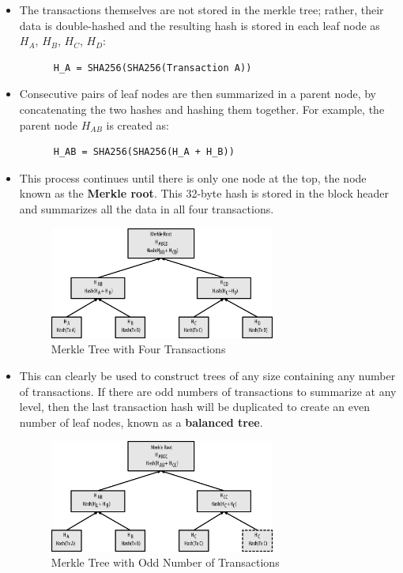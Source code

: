 \documentclass{article}
\begin{document}
    \begin{itemize}
      \item The transactions themselves are not stored in the merkle tree; rather, their data is double-hashed and the resulting hash is stored in each leaf node as $H_A$, $H_B$, $H_C$, $H_D$:
      \begin{lstlisting}
      H_A = SHA256(SHA256(Transaction A))
      \end{lstlisting}
      \item Consecutive pairs of leaf nodes are then summarized in a parent node, by concatenating the two hashes and hashing them together. For example, the parent node $H_{AB}$ is created as:
      \begin{lstlisting}
      H_AB = SHA256(SHA256(H_A + H_B))
      \end{lstlisting}
      \item This process continues until there is only one node at the top, the node known as the \textbf{Merkle root}. This 32-byte hash is stored in the block header and summarizes all the data in all four transactions.
      
      \begin{figure}[H]
      \centering
      \includegraphics[width=0.7\textwidth]{img/msbt_0702.png}
      \caption{Merkle Tree with Four Transactions}
      \end{figure}

      \item This can clearly be used to construct trees of any size containing any number of transactions. If there are odd numbers of transactions to summarize at any level, then the last transaction hash will be duplicated to create an even number of leaf nodes, known as a \textbf{balanced tree}.
      
      \begin{figure}[H]
      \centering
      \includegraphics[width=0.7\textwidth]{img/msbt_0703.png}
      \caption{Merkle Tree with Odd Number of Transactions}
      \end{figure}
    \end{itemize}
\end{document}
